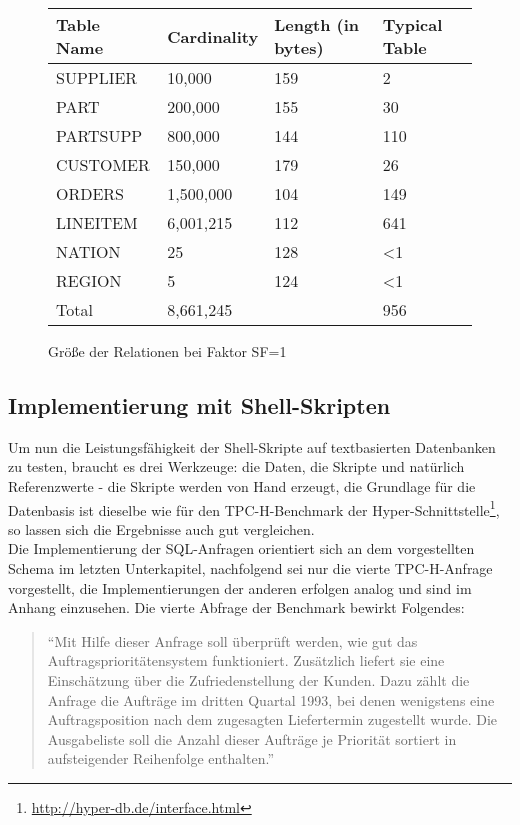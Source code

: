 \begin{figure}[htb]
\centering
\begin{tabular}{p{}|p{}|p{}|p{}}
Table Name & Cardinality &  Length (in bytes) &  Typical Table \\\hline
SUPPLIER & 10,000  & 159&  2\\
PART 	& 200,000 &155& 30 \\
PARTSUPP & 800,000 & 144 & 110 \\
CUSTOMER & 150,000 & 179 & 26 \\
ORDERS   & 1,500,000 & 104 & 149 \\
LINEITEM &  6,001,215 & 112 & 641 \\
NATION & 25 & 128 & <1 \\
REGION & 5 & 124 & <1 \\\hline
Total & 8,661,245 && 956
\end{tabular}
\caption{Größe der Relationen bei Faktor SF=1 \cite{TPC-H}}
\end{figure}

\subsection{Implementierung mit Shell-Skripten}
Um nun die Leistungsfähigkeit der Shell-Skripte auf textbasierten Datenbanken zu testen, braucht es drei Werkzeuge: die Daten, die Skripte und natürlich Referenzwerte - die Skripte werden von Hand erzeugt, die Grundlage für die Datenbasis ist dieselbe wie für den TPC-H-Benchmark der Hyper-Schnittstelle\footnote{\url{http://hyper-db.de/interface.html}}, so lassen sich die Ergebnisse auch gut vergleichen.\\

Die Implementierung der SQL-Anfragen orientiert sich an dem vorgestellten Schema im letzten Unterkapitel, nachfolgend sei nur die vierte TPC-H-Anfrage vorgestellt, die Implementierungen der anderen erfolgen analog und sind im Anhang einzusehen. Die vierte Abfrage der Benchmark bewirkt Folgendes:

\begin{quotation}
"`Mit Hilfe dieser Anfrage soll überprüft werden, wie gut das Auftragsprioritätensystem funktioniert. Zusätzlich liefert sie eine Einschätzung über die Zufriedenstellung der Kunden. Dazu zählt die Anfrage die Aufträge im dritten Quartal 1993, bei denen wenigstens eine Auftragsposition nach dem zugesagten Liefertermin zugestellt wurde. Die Ausgabeliste soll die Anzahl dieser Aufträge je Priorität sortiert in aufsteigender Reihenfolge enthalten."' \cite[S. 717]{Kemper}
\end{quotation}


